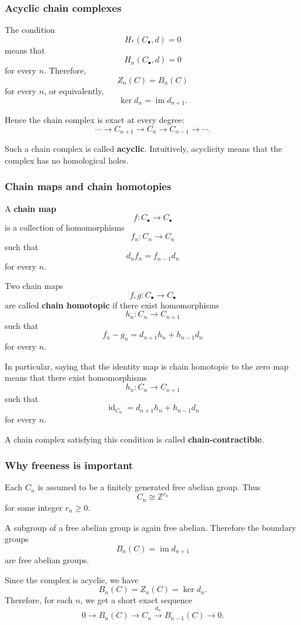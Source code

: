 \documentclass[12pt,a4paper]{article}
\theoremstyle{notespace}
\begin{document}
\subsubsection{Acyclic chain complexes}

The condition
\[
H_*(C_\bullet,d)=0
\]
means that
\[
H_n(C_\bullet,d)=0
\]
for every \(n\). Therefore,
\[
Z_n(C)=B_n(C)
\]
for every \(n\), or equivalently,
\[
\ker d_n=\operatorname{im} d_{n+1}.
\]

Hence the chain complex is exact at every degree:
\[
\cdots \to C_{n+1}\to C_n\to C_{n-1}\to \cdots .
\]

Such a chain complex is called \textbf{acyclic}. Intuitively, acyclicity means that the complex has no homological holes.

\subsubsection{Chain maps and chain homotopies}

A \textbf{chain map}
\[
f\colon C_\bullet\to C_\bullet
\]
is a collection of homomorphisms
\[
f_n\colon C_n\to C_n
\]
such that
\[
d_n f_n=f_{n-1}d_n
\]
for every \(n\).

Two chain maps
\[
f,g\colon C_\bullet\to C_\bullet
\]
are called \textbf{chain homotopic} if there exist homomorphisms
\[
h_n\colon C_n\to C_{n+1}
\]
such that
\[
f_n-g_n=d_{n+1}h_n+h_{n-1}d_n
\]
for every \(n\).

In particular, saying that the identity map is chain homotopic to the zero map means that there exist homomorphisms
\[
h_n\colon C_n\to C_{n+1}
\]
such that
\[
\operatorname{id}_{C_n}=d_{n+1}h_n+h_{n-1}d_n
\]
for every \(n\).

A chain complex satisfying this condition is called \textbf{chain-contractible}.

\subsubsection{Why freeness is important}

Each \(C_n\) is assumed to be a finitely generated free abelian group. Thus
\[
C_n\cong \mathbb Z^{r_n}
\]
for some integer \(r_n\geq 0\).

A subgroup of a free abelian group is again free abelian. Therefore the boundary groups
\[
B_n(C)=\operatorname{im} d_{n+1}
\]
are free abelian groups.

Since the complex is acyclic, we have
\[
B_n(C)=Z_n(C)=\ker d_n.
\]
Therefore, for each \(n\), we get a short exact sequence
\[
0\to B_n(C)\to C_n\xrightarrow{d_n} B_{n-1}(C)\to 0.
\]
\end{document}
